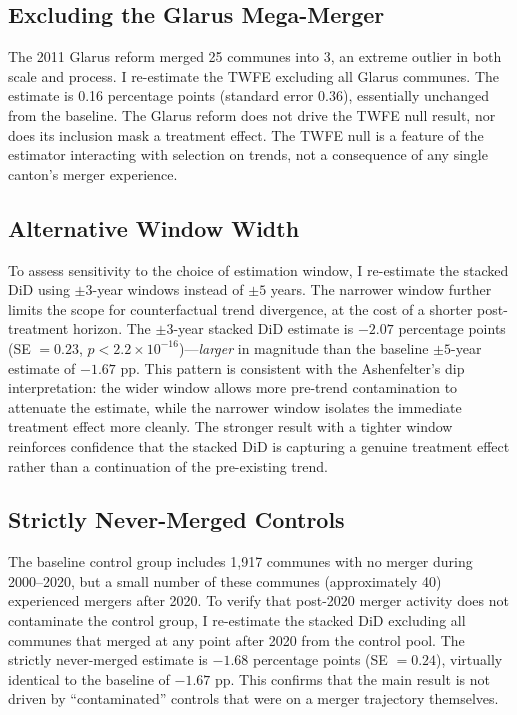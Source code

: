 \documentclass[12pt]{article}
\begin{document}
\subsection{Excluding the Glarus Mega-Merger}

The 2011 Glarus reform merged 25 communes into 3, an extreme outlier in both scale and process. I re-estimate the TWFE excluding all Glarus communes. The estimate is 0.16 percentage points (standard error 0.36), essentially unchanged from the baseline. The Glarus reform does not drive the TWFE null result, nor does its inclusion mask a treatment effect. The TWFE null is a feature of the estimator interacting with selection on trends, not a consequence of any single canton's merger experience.

\subsection{Alternative Window Width}

To assess sensitivity to the choice of estimation window, I re-estimate the stacked DiD using $\pm 3$-year windows instead of $\pm 5$ years. The narrower window further limits the scope for counterfactual trend divergence, at the cost of a shorter post-treatment horizon. The $\pm 3$-year stacked DiD estimate is $-2.07$ percentage points (SE $= 0.23$, $p < 2.2 \times 10^{-16}$)---\textit{larger} in magnitude than the baseline $\pm 5$-year estimate of $-1.67$ pp. This pattern is consistent with the Ashenfelter's dip interpretation: the wider window allows more pre-trend contamination to attenuate the estimate, while the narrower window isolates the immediate treatment effect more cleanly. The stronger result with a tighter window reinforces confidence that the stacked DiD is capturing a genuine treatment effect rather than a continuation of the pre-existing trend.

\subsection{Strictly Never-Merged Controls}

The baseline control group includes 1,917 communes with no merger during 2000--2020, but a small number of these communes (approximately 40) experienced mergers after 2020. To verify that post-2020 merger activity does not contaminate the control group, I re-estimate the stacked DiD excluding all communes that merged at any point after 2020 from the control pool. The strictly never-merged estimate is $-1.68$ percentage points (SE $= 0.24$), virtually identical to the baseline of $-1.67$ pp. This confirms that the main result is not driven by ``contaminated'' controls that were on a merger trajectory themselves.
\end{document}
